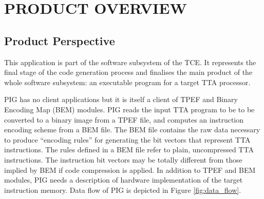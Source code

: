 \documentclass[a4paper,twoside]{tce}
\begin{document}




\chapter{PRODUCT OVERVIEW}

\section{Product Perspective}



%
%

%
%

This application is part of the software subsystem of the TCE. It represents
the final stage of the code generation process and finalises the main
product of the whole software subsystem: an executable program for a target
TTA processor.

PIG has no client applications but it is itself a client of TPEF and Binary
Encoding Map (BEM) modules. PIG reads the input TTA program to be to be
converted to a binary image from a TPEF file, and computes an instruction
encoding scheme from a BEM file. The BEM file contains the raw data
necessary to produce ``encoding rules'' for generating the bit vectors that
represent TTA instructions.  The rules defined in a BEM file refer to plain,
uncompressed TTA instructions. The instruction bit vectors may be totally
different from those implied by BEM if code compression is applied. In
addition to TPEF and BEM modules, PIG needs a description of hardware
implementation of the target instruction memory. Data flow of PIG is
depicted in Figure \ref{fig:data_flow}.
\end{document}
